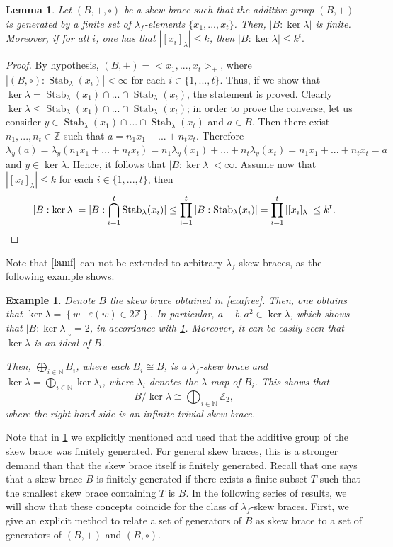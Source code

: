 \documentclass{amsart}
\newcommand{\Stab}{\operatorname{Stab}}
\newtheorem{lem}[thm]{Lemma}
\newtheorem{exa}[thm]{Example}
\begin{document}
\begin{lem}\label{lamf}
    Let $(B,+,\circ)$ be a skew brace such that the additive group $(B,+)$ is generated by a finite set of $\lambda_f$-elements $\{x_1,...,x_t\}$. Then, $|B:\ker\lambda|$ is finite. Moreover, if for all $i$, one has that $|[x_i]_{\lambda}| \leq k$, then $|B:\ker\lambda| \leq k^t. $
\end{lem}
\begin{proof}
    By hypothesis, $(B,+)=<x_1,...,x_t>_+$, where $|(B,\circ):\Stab_\lambda(x_i)|<\infty$ for each $i\in \{1,...,t\}$. Thus, if we show that $\ker\lambda=\Stab_\lambda(x_1)\cap...\cap\Stab_\lambda(x_t)$, the statement is proved. Clearly $\ker\lambda\leq\Stab_\lambda(x_1)\cap...\cap\Stab_\lambda(x_t)$; in order to prove the converse, let us consider $y\in \Stab_\lambda(x_1)\cap...\cap\Stab_\lambda(x_t)$ and $a\in B$. Then there exist $n_1,...,n_t\in \mathbb{Z}$ such that $a=n_1x_1+...+n_tx_t$. Therefore $\lambda_y(a)=\lambda_y(n_1x_1+...+n_tx_t)=n_1\lambda_y(x_1)+...+n_t\lambda_y(x_t)=n_1x_1+...+n_tx_t=a$ and $y\in\ker\lambda$. 
    Hence, it follows that $|B:\ker \lambda|<\infty$. Assume now that $|[x_i]_{\lambda}| \leq k$ for each $i\in\{1,...,t\}$, then 
    \[
    |B: \ker \lambda| =|B: \bigcap_{i=1}^t\Stab_{\lambda}(x_i)| \leq \prod_{i=1}^t|B:\Stab_{\lambda}(x_i)|=\prod_{i=1}^t|[x_i]_{\lambda}|\leq k^t.\qedhere
    \]
\end{proof}

    Note that $\cref{lamf}$ can not be extended to arbitrary $\lambda_f$-skew braces, as the following example shows.
\begin{exa}
    Denote $B$ the skew brace obtained in \cref{exafree}. Then, one obtains that $\ker \lambda= \left\lbrace w \mid \varepsilon(w)\in 2\mathbb{Z}\right\rbrace$. In particular, $a-b, a^2 \in  \ker \lambda$, which shows that $|B:\ker\lambda|_{\circ}=2$, in accordance with \cref{lamf}. Moreover, it can be easily seen that $\ker\lambda$ is an ideal of $B$.
    
    Then, $\bigoplus_{i\in \mathbb{N}} B_i$, where each $B_i \cong B$, is a $\lambda_f$-skew brace and $\ker \lambda = \bigoplus_{i\in \mathbb{N}} \ker \lambda_i$, where $\lambda_i$ denotes the $\lambda$-map of $B_i$. This shows that $$B/\ker\lambda \cong \bigoplus_{i\in \mathbb{N}} \mathbb{Z}_2,$$ where the right hand side is an infinite trivial skew brace.
\end{exa}

Note that in \cref{lamf} we explicitly mentioned and used that the additive group of the skew brace was finitely generated. For general skew braces, this is a stronger demand than that the skew brace itself is finitely generated. Recall that one says that a skew brace $B$ is finitely generated if there exists a finite subset $T$ such that the smallest skew brace containing $T$ is $B$. In the following series of results, we will show that these concepts coincide for the class of $\lambda_f$-skew braces. First, we give an explicit method to relate a set of generators of $B$ as skew brace to a set of generators of $(B,+)$ and $(B,\circ)$.
\end{document}
